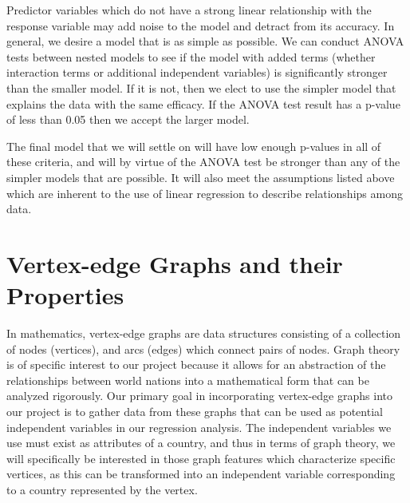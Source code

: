 \documentclass[oneside,12pt]{report}
\begin{document}
Predictor variables which do not have a strong linear relationship with the response variable may add noise to the model and detract from its accuracy. In general, we desire a model that is as simple as possible. We can conduct ANOVA tests between nested models to see if the model with added terms (whether interaction terms or additional independent variables) is significantly stronger than the smaller model. If it is not, then we elect to use the simpler model that explains the data with the same efficacy. If the ANOVA test result has a p-value of less than 0.05 then we accept the larger model.

The final model that we will settle on will have low enough p-values in all of these criteria, and will by virtue of the ANOVA test be stronger than any of the simpler models that are possible. It will also meet the assumptions listed above which are inherent to the use of linear regression to describe relationships among data.

\section*{Vertex-edge Graphs and their Properties}

In mathematics, vertex-edge graphs are data structures consisting of a collection of nodes (vertices), and arcs (edges) which connect pairs of nodes. Graph theory is of specific interest to our project because it allows for an abstraction of the relationships between world nations into a mathematical form that can be analyzed rigorously. Our primary goal in incorporating vertex-edge graphs into our project is to gather data from these graphs that can be used as potential independent variables in our regression analysis. The independent variables we use must exist as attributes of a country, and thus in terms of graph theory, we will specifically be interested in those graph features which characterize specific vertices, as this can be transformed into an independent variable corresponding to a country represented by the vertex.
\end{document}
